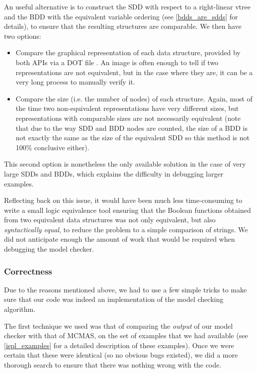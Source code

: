 \documentclass[11pt]{article}
\begin{document}
An useful alternative is to construct the SDD with respect to a right-linear vtree and the BDD with the equivalent variable ordering (see \ref{bdds_are_sdds} for details), to ensure that the resulting structures are comparable. We then have two options:
\begin{itemize}

\item Compare the graphical representation of each data structure, provided by both APIs via a DOT file \cite{dot}. An image is often enough to tell if two representations are not equivalent, but in the case where they are, it can be a very long process to manually verify it.
\item Compare the size (i.e. the number of nodes) of each structure. Again, most of the time two non-equivalent representations have very different sizes, but representations with comparable sizes are not necessarily equivalent (note that due to the way SDD and BDD nodes are counted, the size of a BDD is not exactly the same as the size of the equivalent SDD so this method is not 100\% conclusive either).

\end{itemize}
 This second option is nonetheless the only available solution in the case of very large SDDs and BDDs, which explains the difficulty in debugging larger examples.

Reflecting back on this issue, it would have been much less time-consuming to write a small logic equivalence tool ensuring that the Boolean functions obtained from two equivalent data structures was not only equivalent, but also \textit{syntactically equal}, to reduce the problem to a simple comparison of strings. We did not anticipate enough the amount of work that would be required when debugging the model checker.

\subsubsection{Correctness}

 Due to the reasons mentioned above, we had to use a few simple tricks to make sure that our code was indeed an implementation of the model checking algorithm. 

The first technique we used was that of comparing the \textit{output} of our model checker with that of MCMAS, on the set of examples that we had available (see \ref{ispl_examples} for a detailed description of these examples). Once we were certain that these were identical (so no obvious bugs existed), we did a more thorough search to ensure that there was nothing wrong with the code. 
\end{document}
